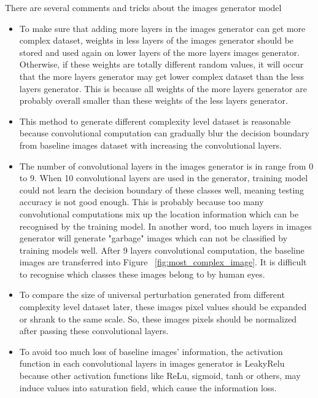 \documentclass{article}
\begin{document}
There are several comments and tricks about the images generator model
\begin{itemize}
    
    \item To make sure that adding more layers in the images generator can get more complex dataset, weights in less layers of the images generator should be stored and used again on lower layers of the more layers images generator. Otherwise, if these weights are totally different random values, it will occur that the more layers generator may get lower complex dataset than the less layers generator. This is because all weights of the more layers generator are probably overall smaller than these weights of the less layers generator.
    
    \item This method to generate different complexity level dataset is reasonable because convolutional computation can gradually blur the decision boundary from baseline images dataset with increasing the convolutional layers.
    
    \item The number of convolutional layers in the images generator is in range from 0 to 9. When 10 convolutional layers are used in the generator, training model could not learn the decision boundary of these classes well, meaning testing accuracy is not good enough. This is probably because too many convolutional computations mix up the location information which can be recognised by the training model. In another word, too much layers in images generator will generate "garbage" images which can not be classified by training models well. After 9 layers convolutional computation, the baseline images are transferred into Figure~ \ref{fig:most_complex_image}. It is difficult to recognise which classes these images belong to by human eyes.
    
    \item To compare the size of universal perturbation generated from different complexity level dataset later, these images pixel values should be expanded or shrank to the same scale. So, these images pixels should be normalized after passing these convolutional layers.
    
    \item To avoid too much loss of baseline images' information, the activation function in each convolutional layers in images generator is LeakyRelu because other activation functions like ReLu, sigmoid, tanh or others, may induce values into saturation field, which cause the information loss.
\end{itemize}
\end{document}
